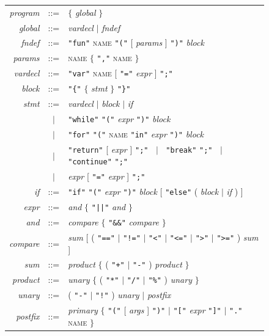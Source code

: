 \documentclass[11pt,a4paper]{article}
\newcommand{\nt}[1]{\textit{#1}}
\newcommand{\tok}[1]{\texttt{"#1"}}
\begin{document}
\begin{figure}[t]
\centering
\renewcommand{\arraystretch}{1.15}
\begin{tabular}{@{}r@{\quad}c@{\quad}l@{}}
\nt{program}  & ::= & $\{$ \nt{global} $\}$\\
\nt{global}   & ::= & \nt{vardecl} $\mid$ \nt{fndef}\\
\nt{fndef}    & ::= & \tok{fun} \textsc{name} \tok{(} [ \nt{params} ] \tok{)} \nt{block}\\
\nt{params}   & ::= & \textsc{name} $\{$ \tok{,} \textsc{name} $\}$\\
\nt{vardecl}  & ::= & \tok{var} \textsc{name} [ \tok{=} \nt{expr} ] \tok{;}\\[5pt]
\nt{block}    & ::= & \tok{\{} $\{$ \nt{stmt} $\}$ \tok{\}}\\
\nt{stmt}     & ::= & \nt{vardecl} $\mid$ \nt{block} $\mid$ \nt{if}\\
              & $\mid$ & \tok{while} \tok{(} \nt{expr} \tok{)} \nt{block}\\
              & $\mid$ & \tok{for} \tok{(} \textsc{name} \tok{in} \nt{expr} \tok{)} \nt{block}\\
              & $\mid$ & \tok{return} [ \nt{expr} ] \tok{;}
                $\;\mid\;$ \tok{break} \tok{;} $\;\mid\;$ \tok{continue} \tok{;}\\
              & $\mid$ & \nt{expr} [ \tok{=} \nt{expr} ] \tok{;}\\
\nt{if}       & ::= & \tok{if} \tok{(} \nt{expr} \tok{)} \nt{block} [ \tok{else} ( \nt{block} $\mid$ \nt{if} ) ]\\[5pt]
\nt{expr}     & ::= & \nt{and} $\{$ \tok{||} \nt{and} $\}$\\
\nt{and}      & ::= & \nt{compare} $\{$ \tok{\&\&} \nt{compare} $\}$\\
\nt{compare}  & ::= & \nt{sum} [ ( \tok{==} $\mid$ \tok{!=} $\mid$ \tok{<} $\mid$ \tok{<=} $\mid$ \tok{>} $\mid$ \tok{>=} ) \nt{sum} ]\\
\nt{sum}      & ::= & \nt{product} $\{$ ( \tok{+} $\mid$ \tok{-} ) \nt{product} $\}$\\
\nt{product}  & ::= & \nt{unary} $\{$ ( \tok{*} $\mid$ \tok{/} $\mid$ \tok{\%} ) \nt{unary} $\}$\\
\nt{unary}    & ::= & ( \tok{-} $\mid$ \tok{!} ) \nt{unary} $\mid$ \nt{postfix}\\
\nt{postfix}  & ::= & \nt{primary} $\{$ \tok{(} [ \nt{args} ] \tok{)} $\mid$ \tok{[} \nt{expr} \tok{]} $\mid$ \tok{.} \textsc{name} $\}$\\

\end{tabular}
\end{figure}
\end{document}
